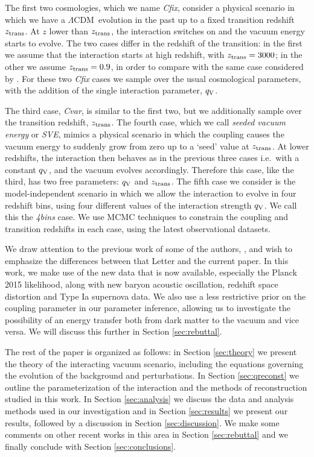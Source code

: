 \documentclass[a4paper,fleqn,usenatbib]{mnras}
\newcommand*{\LCDM}{$\Lambda$CDM}
\begin{document}
The first  two cosmologies, which we name \textit{Cfix}, consider a physical scenario in which we have a \LCDM \ evolution in the past up to a fixed transition redshift $z_{\rm trans}$. At $z$  lower than $z_{\rm trans}$, the interaction switches on and the vacuum energy starts to evolve. The two cases differ in the redshift of the transition: in the first we assume that the interaction starts at high redshift, with $z_{\rm trans}=3000$; in the other we assume  $z_{\rm trans}=0.9$, in order to compare with the same case considered by \cite{Salvatelli2014}. For these two \textit{Cfix} cases we sample over the usual cosmological parameters, with the addition of the single interaction parameter, $q_{\rm V}$.

The third case, \textit{Cvar}, is similar to the first two, but we additionally sample over the transition redshift, $z_{\rm trans}$. The fourth case, which we call \textit{seeded vacuum energy} or \textit{SVE}, mimics a physical scenario in which the coupling causes the vacuum energy to suddenly grow from zero up to a  `seed' value at $z_{\rm trans}$. At lower redshifts, the interaction then behaves as in the previous three cases i.e.\ with a constant $q_{\rm V}$, and the vacuum evolves accordingly. Therefore this case, like the third, has two free parameters: $q_{\rm V}$ and $z_{\rm trans}$. The fifth case we consider is the model-independent scenario in which we allow the interaction to evolve in four redshift bins, using four different values of the interaction strength $q_{\rm V}$. We call this the \textit{4bins} case. We use MCMC techniques to constrain the coupling and transition redshifts in each case, using the latest observational datasets.

We draw attention to the previous work of some of the authors, \cite{Salvatelli2014}, and wish to emphasize the differences between that Letter and the current paper. In this work, we make use of the new data that is now available, especially the Planck 2015 likelihood, along with new baryon acoustic oscillation, redshift space distortion and Type Ia supernova data. We also use a less restrictive prior on the coupling parameter in our parameter inference, allowing us to investigate the possibility of an energy transfer both from dark matter to the vacuum and vice versa. We will discuss this further in Section \ref{sec:rebuttal}.

The rest of the paper is organized as follows: in Section \ref{sec:theory} we present the theory of the interacting vacuum scenario, including the equations governing the evolution of the background and perturbations. In Section \ref{sec:qreconst} we outline the parameterization of the interaction and the methods of reconstruction studied in this work. In Section \ref{sec:analysis} we discuss the data and analysis methods used in our investigation and in Section \ref{sec:results} we present our results, followed by a discussion in Section \ref{sec:discussion}. We make some comments on other recent works in this area in Section \ref{sec:rebuttal} and we finally conclude with Section \ref{sec:conclusions}.
\end{document}
